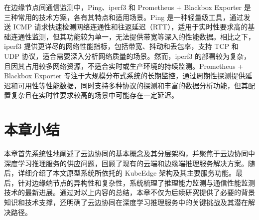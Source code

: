 在边缘节点间通信监测中，Ping、iperf3 和 Prometheus + Blackbox Exporter 是三种常用的技术方案，各有其特点和适用场景。Ping 是一种轻量级工具，通过发送 ICMP 请求快速检测网络连通性和往返延迟（RTT），适用于实时性要求高的基础连通性监测，但其功能较为单一，无法提供带宽等深入的性能数据。相比之下，iperf3 提供更详尽的网络性能指标，包括带宽、抖动和丢包率，支持 TCP 和 UDP 协议，适合需要深入分析网络质量的场景。然而，iperf3 的部署较为复杂，且因其占用较多网络资源，不适合实时或生产环境的持续监测。Prometheus + Blackbox Exporter 专注于大规模分布式系统的长期监控，通过周期性探测提供延迟和可用性等性能数据，同时支持多种协议的探测和丰富的数据分析功能，但其配置复杂且在实时性要求较高的场景中可能存在一定延迟。

\section{本章小结}

本章首先系统性地阐述了云边协同的基本概念及其分层架构，并聚焦于云边协同中深度学习推理服务的供应问题，回顾了现有的云端和边缘端推理服务解决方案。随后，详细介绍了本文原型系统所依托的 KubeEdge 架构及其主要服务功能。最后，针对边缘端节点的异构性和复杂性，系统梳理了推理能力监测与通信性能监测技术的最新进展。通过对以上内容的总结，本章不仅为后续研究提供了必要的背景知识和技术支撑，还明确了云边协同在深度学习推理服务中的关键挑战及其潜在解决路径。

